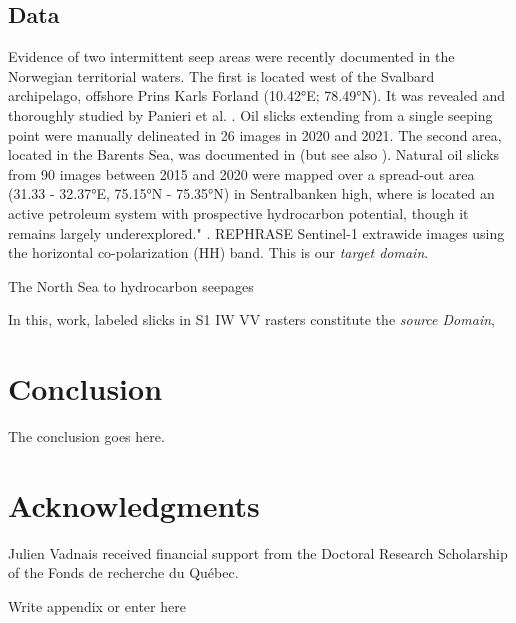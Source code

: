 \documentclass[journal]{IEEEtran}
\begin{document}
\subsection{Data}
Evidence of two intermittent seep areas were recently documented in the Norwegian territorial waters. The first is located west of the Svalbard archipelago, offshore Prins Karls Forland (10.42°E; 78.49°N). 
It was revealed and thoroughly studied by Panieri et al. \cite{panieriArcticNaturalOil2024}. Oil slicks extending from a single seeping point were manually delineated in 26 images in 2020 and 2021. 
The second area, located in the Barents Sea, was documented in \cite{serovWidespreadNaturalMethane2023} (but see also \cite{ivanovSearchDetectionNatural2020}). Natural oil slicks from 90 images between 2015 and 2020 
were mapped over a spread-out area (31.33 - 32.37°E, 75.15°N - 75.35°N) in Sentralbanken high, where is located an active petroleum system with prospective hydrocarbon potential, though it remains largely underexplored."
\cite{lundschienNorthBarentsComposite2025}. REPHRASE Sentinel-1 extrawide images using the horizontal co-polarization (HH) band. This is our \textit{target domain}.


The North Sea to hydrocarbon seepages \cite{juddSeabedFluidFlow2009,hovlandSeabedPockmarksSeepages1988}

In this, work, labeled slicks in S1 IW VV rasters constitute the \textit{source Domain},















\section{Conclusion}
The conclusion goes here.


\section*{Acknowledgments}
Julien Vadnais received financial support from the Doctoral Research Scholarship of the Fonds de recherche du Québec.

{\appendix[Appendix A]
Write appendix or enter here
}



\end{document}
